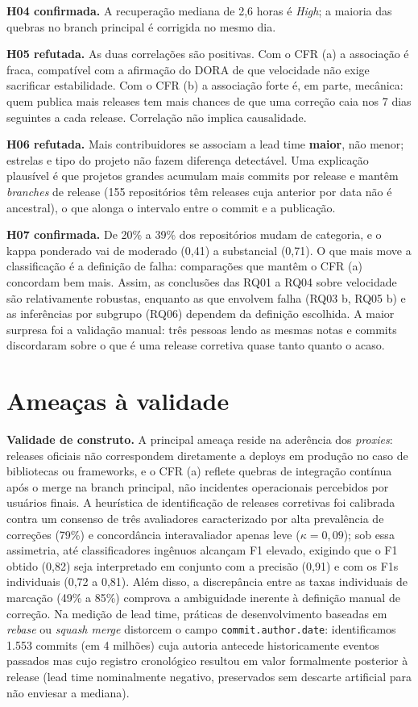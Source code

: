 \documentclass[12pt]{article}
\begin{document}
\textbf{H04 confirmada.} A recuperação mediana de 2,6 horas é \textit{High}; a maioria das quebras no branch principal é corrigida no mesmo dia.

\textbf{H05 refutada.} As duas correlações são positivas. Com o CFR (a) a associação é fraca, compatível com a afirmação do DORA de que velocidade não exige sacrificar estabilidade. Com o CFR (b) a associação forte é, em parte, mecânica: quem publica mais releases tem mais chances de que uma correção caia nos 7 dias seguintes a cada release. Correlação não implica causalidade.

\textbf{H06 refutada.} Mais contribuidores se associam a lead time \textbf{maior}, não menor; estrelas e tipo do projeto não fazem diferença detectável. Uma explicação plausível é que projetos grandes acumulam mais commits por release e mantêm \textit{branches} de release (155 repositórios têm releases cuja anterior por data não é ancestral), o que alonga o intervalo entre o commit e a publicação.

\textbf{H07 confirmada.} De 20\% a 39\% dos repositórios mudam de categoria, e o kappa ponderado vai de moderado (0,41) a substancial (0,71). O que mais move a classificação é a definição de falha: comparações que mantêm o CFR (a) concordam bem mais. Assim, as conclusões das RQ01 a RQ04 sobre velocidade são relativamente robustas, enquanto as que envolvem falha (RQ03 b, RQ05 b) e as inferências por subgrupo (RQ06) dependem da definição escolhida. A maior surpresa foi a validação manual: três pessoas lendo as mesmas notas e commits discordaram sobre o que é uma release corretiva quase tanto quanto o acaso.

\section{Ameaças à validade}\label{sec:ameacas}

\textbf{Validade de construto.} A principal ameaça reside na aderência dos \textit{proxies}: releases oficiais não correspondem diretamente a deploys em produção no caso de bibliotecas ou frameworks, e o CFR (a) reflete quebras de integração contínua após o merge na branch principal, não incidentes operacionais percebidos por usuários finais. A heurística de identificação de releases corretivas foi calibrada contra um consenso de três avaliadores caracterizado por alta prevalência de correções (79\%) e concordância interavaliador apenas leve ($\kappa = 0{,}09$); sob essa assimetria, até classificadores ingênuos alcançam F1 elevado, exigindo que o F1 obtido (0,82) seja interpretado em conjunto com a precisão (0,91) e com os F1s individuais (0,72 a 0,81). Além disso, a discrepância entre as taxas individuais de marcação (49\% a 85\%) comprova a ambiguidade inerente à definição manual de correção. Na medição de lead time, práticas de desenvolvimento baseadas em \textit{rebase} ou \textit{squash merge} distorcem o campo \texttt{commit.author.date}: identificamos 1.553 commits (em 4 milhões) cuja autoria antecede historicamente eventos passados mas cujo registro cronológico resultou em valor formalmente posterior à release (lead time nominalmente negativo, preservados sem descarte artificial para não enviesar a mediana).
\end{document}
